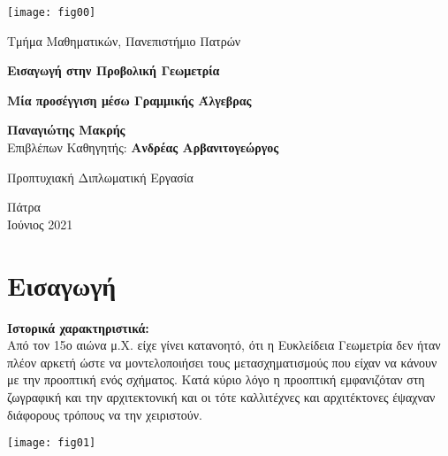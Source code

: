 \documentclass[12pt, a4paper]{book}
\begin{document}
\begin{titlepage}
\begin{center}
\texttt{[image: fig00]}   
   
\vspace*{1cm}  
Τμήμα Μαθηματικών, Πανεπιστήμιο Πατρών\\ 
   
\vspace*{3cm}

\textbf{Εισαγωγή στην Προβολική Γεωμετρία}

\textbf{Μία προσέγγιση μέσω Γραμμικής Άλγεβρας}

\vspace{0.5cm}
           
\vspace{1.5cm}

\textbf{Παναγιώτης Μακρής} 
\text{ }       
\\
\text{ }
Επιβλέπων Καθηγητής: \textbf{Ανδρέας Αρβανιτογεώργος}
      
\vfill
            
Προπτυχιακή Διπλωματική Εργασία
            
\vspace{0.8cm}
                
Πάτρα\\
Ιούνιος 2021
            
\end{center}
\end{titlepage}

\thispagestyle{empty}

\tableofcontents

\thispagestyle{empty}

\chapter{Εισαγωγή}


\textbf{Ιστορικά χαρακτηριστικά:}\\

Από τον 15ο αιώνα μ.Χ. είχε γίνει κατανοητό, ότι η Ευκλείδεια Γεωμετρία δεν ήταν πλέον αρκετή ώστε να μοντελοποιήσει τους μετασχηματισμούς που είχαν να κάνουν με την προοπτική ενός σχήματος. Κατά κύριο λόγο η προοπτική εμφανιζόταν στη ζωγραφική και την αρχιτεκτονική και οι τότε καλλιτέχνες και αρχιτέκτονες έψαχναν διάφορους τρόπους να την χειριστούν.

\begin{center}
\texttt{[image: fig01]}
\end{center}
\end{document}
